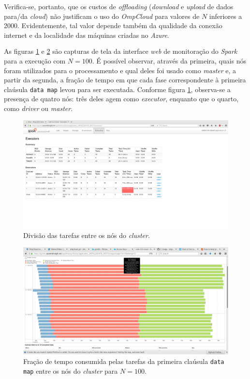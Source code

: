 \documentclass[12pt, a4paper]{article}
\begin{document}
Verifica-se, portanto, que os custos de \textit{offloading} (\textit{download}
e \textit{upload} de dados para/da \textit{cloud}) não justificam o uso do
\textit{OmpCloud} para valores de \(N\) inferiores a 2000. Evidentemente, tal
valor depende também da qualidade da conexão internet e da localidade das máquinas
criadas no \textit{Azure}.

\vspace{12pt}

As figuras \ref{fig:nodes} e \ref{fig:event} são capturas de tela da interface
\textit{web} de monitoração do \textit{Spark} para a execução com \(N=100\). É
possível observar, através da primeira, quais nós foram utilizados para o
processamento e qual deles foi usado como \textit{master} e, a partir da
segunda, a fração de tempo em que cada fase correspondente à primeira claúsula
\texttt{data map} levou para ser executada. Conforme figura
\ref{fig:nodes}, observa-se a presença de quatro nós: três deles agem
como \textit{executor}, enquanto que o quarto, como \textit{driver} ou
\textit{master}.


\begin{figure}[h!] 
    \centering
    \includegraphics[width=\textwidth]{img/100/executors}
    \caption{Divisão das tarefas entre os nós do \textit{cluster}.}        
    \label{fig:nodes}
\end{figure}

\begin{figure}[h!] 
    \centering
    \includegraphics[width=\textwidth]{img/100/event}
    \caption{Fração de tempo consumida pelas tarefas da primeira claúsula
    \texttt{data map} entre os nós do \textit{cluster} para \(N = 100\).}
    \label{fig:event}
\end{figure}
\end{document}
